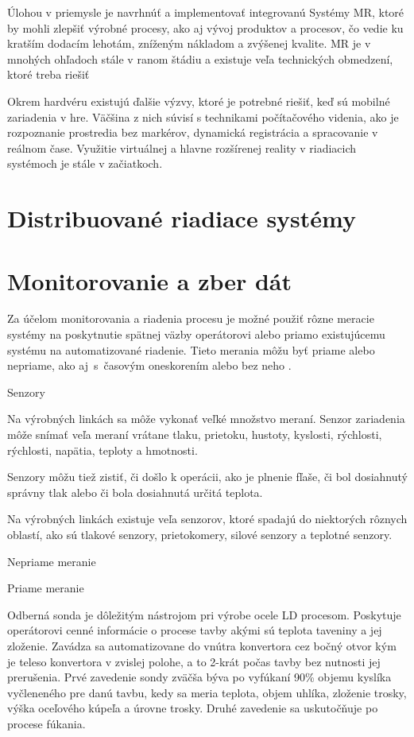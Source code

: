 \documentclass[]{tukediphc}
\begin{document}
Úlohou v priemysle je navrhnúť a implementovať integrovanú
Systémy MR, ktoré by mohli zlepšiť výrobné procesy, ako aj vývoj produktov a procesov, čo vedie ku kratším dodacím lehotám, zníženým nákladom a zvýšenej kvalite. MR je v mnohých ohľadoch stále v ranom štádiu a existuje veľa technických obmedzení, ktoré treba riešiť
\citep{soeteMixedRealitySCADA2015}


Okrem hardvéru existujú ďalšie výzvy, ktoré je potrebné riešiť, keď sú mobilné zariadenia v hre. Väčšina z nich súvisí s technikami počítačového videnia, ako je rozpoznanie prostredia bez markérov, dynamická registrácia a spracovanie v reálnom čase. Využitie virtuálnej a hlavne rozšírenej reality v riadiacich systémoch je stále v začiatkoch. 


\section{Distribuované riadiace systémy}

\section{Monitorovanie a zber dát}

Za účelom monitorovania a riadenia procesu je možné použiť rôzne meracie systémy na poskytnutie spätnej väzby operátorovi alebo priamo existujúcemu systému na automatizované riadenie. Tieto merania môžu byť priame alebo nepriame, ako aj~s~časovým oneskorením alebo bez neho \cite{Widlund1998}.

Senzory

Na výrobných linkách sa môže vykonať veľké množstvo meraní. Senzor zariadenia môže snímať veľa meraní vrátane tlaku, prietoku, hustoty, kyslosti, rýchlosti, rýchlosti, napätia, teploty a hmotnosti.

Senzory môžu tiež zistiť, či došlo k operácii, ako je plnenie fľaše, či bol dosiahnutý správny tlak alebo či bola dosiahnutá určitá teplota.

Na výrobných linkách existuje veľa senzorov, ktoré spadajú do niektorých rôznych oblastí, ako sú tlakové senzory, prietokomery, silové senzory a teplotné senzory.

Nepriame meranie

Priame meranie

Odberná sonda je dôležitým nástrojom pri výrobe ocele LD procesom. Poskytuje operátorovi cenné informácie o procese tavby akými sú teplota taveniny a jej zloženie. Zavádza sa automatizovane do vnútra konvertora cez bočný otvor kým je teleso konvertora v zvislej polohe, a to 2-krát počas tavby bez nutnosti jej prerušenia. Prvé zavedenie sondy zväčša býva po vyfúkaní 90\% objemu kyslíka vyčleneného pre danú tavbu, kedy sa meria teplota, objem uhlíka, zloženie trosky, výška oceľového kúpeľa a úrovne trosky. Druhé zavedenie sa uskutočňuje po procese fúkania.
\end{document}
